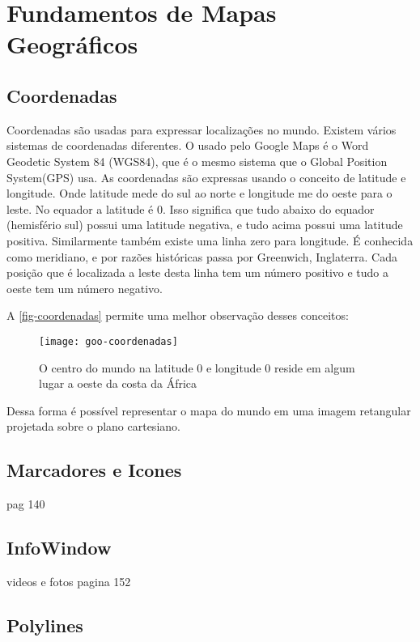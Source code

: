 \section{Fundamentos de Mapas Geográficos}
	
	\subsection{Coordenadas}
	Coordenadas são usadas para expressar localizações no mundo. Existem vários sistemas de coordenadas diferentes. O usado pelo Google Maps é o Word Geodetic System 84 (WGS84), que é o mesmo sistema que o Global Position System(GPS) usa. As coordenadas são expressas usando o conceito de latitude e longitude. Onde latitude mede do sul ao norte e longitude me do oeste para o leste. No equador a latitude é 0. Isso significa que tudo abaixo do equador (hemisfério sul) possui uma latitude negativa, e tudo acima possui uma latitude positiva. Similarmente também existe uma linha zero para longitude. É conhecida como meridiano, e por razões históricas passa por Greenwich, Inglaterra. Cada posição que é localizada a leste desta linha tem um número positivo e tudo a oeste tem um número negativo\cite[4]{livroGoogleApiV3}. 
	
	A \autoref{fig-coordenadas} permite uma melhor observação desses conceitos:
	\begin{figure}[htb]
	\caption{\label{fig-coordenadas} O centro do mundo na latitude 0 e longitude 0 reside em algum lugar a oeste da costa da África}
	\begin{center}
	    \texttt{[image: goo-coordenadas]}
	\end{center}
	\end{figure}
	
	
	Dessa forma é possível representar o mapa do mundo em uma imagem retangular projetada sobre o plano cartesiano. 
	
	\subsection{Marcadores e Icones} pag 140
	\subsection{InfoWindow} videos e fotos pagina 152
	\subsection{Polylines}

